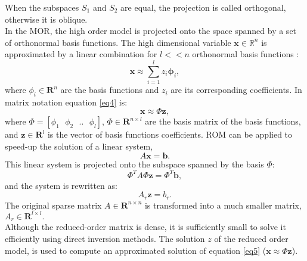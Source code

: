 \documentclass[a4paper,10pt]{report}
\begin{document}
When the subspaces $S_1$ and $S_2$ are equal, the projection is called orthogonal, otherwise it is oblique.\\
In the MOR, the high order model is projected onto the space
spanned by a set of orthonormal basis functions. The high dimensional variable $\mathbf{x} \in \mathbb{R}^n$
is approximated by a linear combination for $l<<n$ orthonormal basis functions \cite{Astrid11}:
\begin{equation}\label{eq4}
  \mathbf{x}\approx \sum_{i=1}^lz_i \mathbf{\phi}_i,
\end{equation}
where $\phi_i \in \mathbf{R}^n$ are the basis functions and $z_i$ are its corresponding coefficients.
In matrix notation equation \eqref{eq4} is:
$$\mathbf{x}\approx \Phi\mathbf{z},$$
where $\Phi=[\phi_1 \text{ }\phi_2 \text{ }.. \text{ }\phi_l]$, $\Phi \in \mathbf{R}^{n\times l}$ are the basis matrix 
of the basis functions, and $\mathbf{z} \in \mathbf{R}^l$ is the vector of basis functions coefficients. 
ROM can be applied to speed-up the solution of a linear system,
\begin{equation}\label{eq5}
 A\mathbf{x}=\mathbf{b}.
\end{equation}
This linear system is projected onto the subspace spanned by the basis $\Phi$:
$$\Phi^TA\Phi \mathbf{z}=\Phi^T\mathbf{b},$$
and the system is rewritten as:
$$A_r\mathbf{z}=b_r.$$
The original sparse matrix $A \in \mathbf{R}^{n\times n}$ is transformed into a much smaller matrix,
$A_r \in \mathbf{R}^{l\times l}.$ \\
Although the reduced-order matrix is dense, it is sufficiently small to solve it efficiently using direct 
inversion methods.
The solution $z$ of the reduced order model, is used
to compute an approximated solution of equation \eqref{eq5} ($\mathbf{x} \approx \Phi \mathbf{z}$).\\
\end{document}
